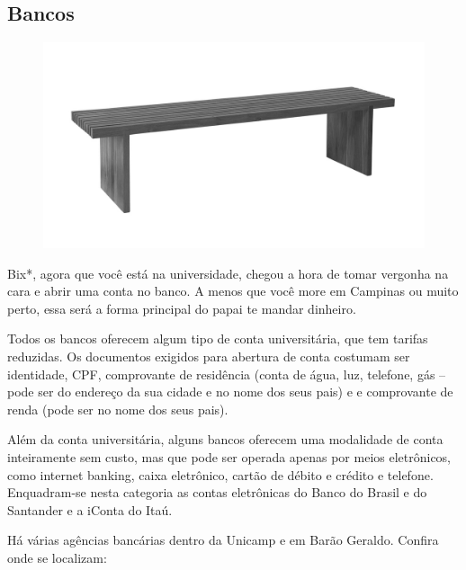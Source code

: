 \subsection{Bancos}

\begin{figure}[h!]
    \centering
    \includegraphics[width=.45\textwidth]{img/barao/banco.jpg}
\end{figure}


Bix*, agora que você está na universidade, chegou a hora de tomar vergonha na
cara e abrir uma conta no banco. A menos que você more em Campinas ou muito
perto, essa será a forma principal do papai te mandar dinheiro.

Todos os bancos oferecem algum tipo de conta universitária, que tem tarifas
reduzidas. Os documentos exigidos para abertura de conta costumam ser
identidade, CPF, comprovante de residência (conta de água, luz, telefone, gás --
pode ser do endereço da sua cidade e no nome dos seus pais) e e comprovante de
renda (pode ser no nome dos seus pais).

Além da conta universitária, alguns bancos oferecem uma modalidade de conta
inteiramente sem custo, mas que pode ser operada apenas por meios eletrônicos,
como internet banking, caixa eletrônico, cartão de débito e crédito e telefone.
Enquadram-se nesta categoria as contas eletrônicas do Banco do Brasil e do
Santander e a iConta do Itaú.

Há várias agências bancárias dentro da Unicamp e em Barão Geraldo. Confira onde
se localizam:

